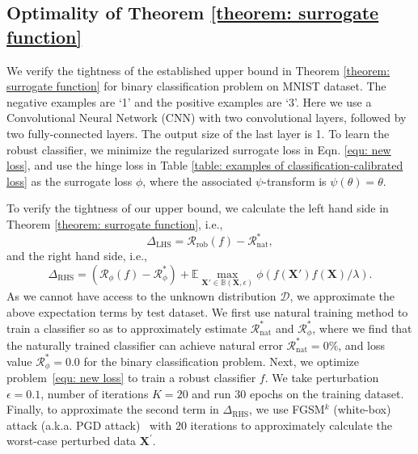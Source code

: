 \documentclass[11pt]{article}
\newcommand{\adv}{\mathrm{rob}}
\newcommand{\nat}{\mathrm{nat}}
\newcommand{\X}{\bm{X}}
\newcommand{\0}{\mathbf{0}}
\newcommand{\1}{\mathbf{1}}
\newcommand{\cD}{\mathcal{D}}
\newcommand{\cR}{\mathcal{R}}
\newcommand{\bbB}{\mathbb{B}}
\newcommand{\bbE}{\mathbb{E}}
\begin{document}
\vspace{-0.2cm}
\subsection{Optimality of Theorem \ref{theorem: surrogate function}}

We verify the tightness of the established upper bound in Theorem \ref{theorem: surrogate function} for binary classification problem on MNIST dataset. The negative examples are `1' and the positive examples are `3'. Here we use a Convolutional Neural Network (CNN) with two convolutional layers, followed by two fully-connected layers. The output size of the last layer is 1. To learn the robust classifier, we minimize the regularized surrogate loss in Eqn. \eqref{equ: new loss}, and use the hinge loss in Table \ref{table: examples of classification-calibrated loss} as the surrogate loss $\phi$, where the associated $\psi$-transform is $\psi(\theta) = \theta$.

To verify the tightness of our upper bound, we calculate the left hand side in Theorem \ref{theorem: surrogate function}, i.e., \vspace{-0.2cm}$$\Delta_{\text{LHS}}=\cR_\adv(f)-\cR_\nat^*,$$ \vspace{-0.2cm}
and the right hand side, i.e., $$\Delta_{\text{RHS}} = (\cR_\phi(f)-\cR_\phi^*)+\bbE \max_{\X'\in\bbB(\X,\epsilon)}\phi(f(\X')f(\X)/\lambda).$$ 
As we cannot have access to the unknown distribution $\cD$, we approximate the above expectation terms by test dataset. We first use natural training method to train a classifier so as to approximately estimate 
$\cR_\nat^*$ and $\cR_\phi^*$, where we find that the naturally trained classifier can achieve natural error $\cR_\nat^*=0\%$, and loss value $\cR_\phi^*=0.0$ for the binary classification problem. Next,  we optimize problem~\eqref{equ: new loss} to train a robust classifier $f$. We take perturbation $\epsilon = 0.1$, number of iterations $K = 20$ and run $30$ epochs on the training dataset. Finally, to approximate the second term in $\Delta_{\text{RHS}}$, we use FGSM$^k$ (white-box) attack (a.k.a. PGD attack)~\cite{kurakin2016adversarial} with $20$ iterations to approximately calculate the worst-case perturbed data $\bm{X}^{\prime}$. 
\end{document}
